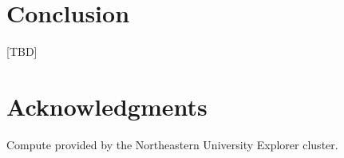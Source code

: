 \documentclass[conference]{IEEEtran}
\begin{document}
\section{Conclusion}
[TBD]

\section*{Acknowledgments}
Compute provided by the Northeastern University Explorer cluster.



\end{document}
